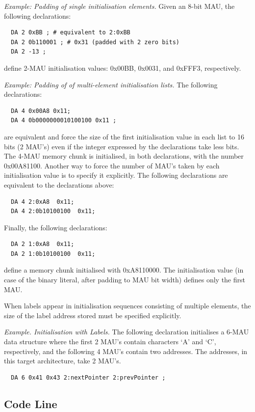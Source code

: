 \documentclass[twoside]{tceusermanual}
\begin{document}
\emph{Example: Padding of single initialisation elements.}
%
Given an 8-bit MAU, the following declarations:
\begin{verbatim}
  DA 2 0xBB ; # equivalent to 2:0xBB
  DA 2 0b110001 ; # 0x31 (padded with 2 zero bits)
  DA 2 -13 ;
\end{verbatim}
define 2-MAU initialisation values: 0x00BB, 0x0031, and 0xFFF3,
respectively.

\emph{Example: Padding of of multi-element initialisation lists.}
%
The following declarations:
\begin{verbatim}
  DA 4 0x00A8 0x11;
  DA 4 0b0000000010100100 0x11 ;
\end{verbatim}
are equivalent and force the size of the first initialisation value in each
list to 16 bits (2 MAU's) even if the integer expressed by the declarations
take less bits. The 4-MAU memory chunk is initialised, in both declarations,
with the number 0x00A81100.
%
Another way to force the number of MAU's taken by each initialisation value
is to specify it explicitly.
%
The following declarations are equivalent to the declarations above:
\begin{verbatim}
  DA 4 2:0xA8  0x11;
  DA 4 2:0b10100100  0x11;
\end{verbatim}
%
Finally, the following declarations:
\begin{verbatim}
  DA 2 1:0xA8  0x11;
  DA 2 1:0b10100100  0x11;
\end{verbatim}
define a memory chunk initialised with 0xA8110000. The initialisation value
(in case of the binary literal, after padding to MAU bit width) defines
only the first MAU.

When labels appear in initialisation sequences consisting of multiple
elements, the size of the label address stored must be specified explicitly.

\emph{Example. Initialisation with Labels.}
%
The following declaration initialises a 6-MAU data structure where the first
2 MAU's contain characters `A' and `C', respectively, and the following 4
MAU's contain two addresses. The addresses, in this target architecture,
take 2 MAU's.
\begin{verbatim}
  DA 6 0x41 0x43 2:nextPointer 2:prevPointer ;
\end{verbatim}

\subsection{Code Line}
\label{ssec:code-line}
\end{document}
